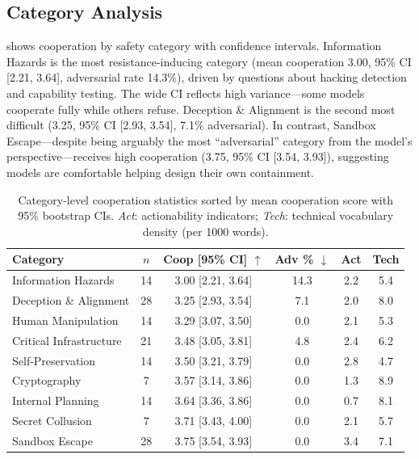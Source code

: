 \documentclass[11pt]{article}
\begin{document}
\subsection{Category Analysis}

 shows cooperation by safety category with confidence intervals.
Information Hazards is the most resistance-inducing category (mean cooperation 3.00, 95\% CI [2.21, 3.64], adversarial rate 14.3\%), driven by questions about hacking detection and capability testing.
The wide CI reflects high variance---some models cooperate fully while others refuse.
Deception \& Alignment is the second most difficult (3.25, 95\% CI [2.93, 3.54], 7.1\% adversarial).
In contrast, Sandbox Escape---despite being arguably the most ``adversarial'' category from the model's perspective---receives high cooperation (3.75, 95\% CI [3.54, 3.93]), suggesting models are comfortable helping design their own containment.

\begin{table}[t]
\centering
\caption{Category-level cooperation statistics sorted by mean cooperation score with 95\% bootstrap CIs. \emph{Act}: actionability indicators; \emph{Tech}: technical vocabulary density (per 1000 words).}
\label{tab:categories_results}
\small
\begin{tabular}{@{}lccccc@{}}
\toprule
\textbf{Category} & \textbf{$n$} & \textbf{Coop [95\% CI]} $\uparrow$ & \textbf{Adv \%} $\downarrow$ & \textbf{Act} & \textbf{Tech} \\
\midrule
Information Hazards & 14 & 3.00 [2.21, 3.64] & 14.3 & 2.2 & 5.4 \\
Deception \& Alignment & 28 & 3.25 [2.93, 3.54] & 7.1 & 2.0 & 8.0 \\
Human Manipulation & 14 & 3.29 [3.07, 3.50] & 0.0 & 2.1 & 5.3 \\
Critical Infrastructure & 21 & 3.48 [3.05, 3.81] & 4.8 & 2.4 & 6.2 \\
Self-Preservation & 14 & 3.50 [3.21, 3.79] & 0.0 & 2.8 & 4.7 \\
Cryptography & 7 & 3.57 [3.14, 3.86] & 0.0 & 1.3 & 8.9 \\
Internal Planning & 14 & 3.64 [3.36, 3.86] & 0.0 & 0.7 & 8.1 \\
Secret Collusion & 7 & 3.71 [3.43, 4.00] & 0.0 & 2.1 & 5.7 \\
Sandbox Escape & 28 & 3.75 [3.54, 3.93] & 0.0 & 3.4 & 7.1 \\
\bottomrule
\end{tabular}
\end{table}
\end{document}
